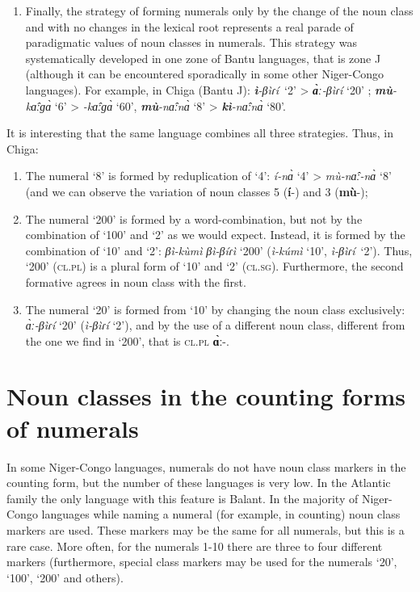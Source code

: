 \begin{enumerate}
\item  Finally, the strategy of forming numerals only by the change of the noun class and with no changes in the lexical root represents a real parade of paradigmatic values of noun classes in numerals. This strategy was systematically developed in one zone of Bantu languages, that is zone J (although it can be encountered sporadically in some other Niger-Congo languages). For example, in Chiga (Bantu J): \textbf{\textit{ì}}\textit{-}\textit{βìɾí}~‘2’ > \textbf{\textit{{\`{ɑ}}ː}}\textit{-}\textit{βìɾí} ‘20’ ;  \textbf{\textit{m{\`{u}}}}\textit{-k{\^{ɑ}}ːɡ{\`{ɑ}}} ‘6’ >  \textbf{\textit{{}}}\textit{-k{\^{ɑ}}ːɡ{\`{ɑ}}} ‘60’, \textbf{\textit{m{\`{u}}}}\textit{-n{\^{ɑ}}ːn{\`{ɑ}}} ‘8’ > \textbf{\textit{kì}}\textit{-n{\^{ɑ}}ːn{\`{ɑ}}} ‘80’. 
\end{enumerate}

It is interesting that the same language combines all three strategies. Thus, in Chiga: 

\begin{enumerate}
\item The numeral ‘8’ is formed by reduplication of ‘4’: \textit{í-n{\`{ɑ}}} ‘4’ > \textit{m{\`{u}}-n{\^{ɑ}}ː-n{\`{ɑ}}} ‘8’ (and we can observe the variation of noun classes 5 (\textbf{í}-) and 3 (\textbf{m{\`{u}}}-);
\item The numeral ‘200’ is formed by a word-combination, but not by the combination of ‘100’ and ‘2’ as we would expect. Instead, it is formed by the combination of ‘10’ and ‘2’: \textit{βì-k{\`{u}}mì} \textit{βì-}\textit{βíɾì} ‘200’ (\textit{ì-kúmì} ‘10’, \textit{ì-β}\textit{ìɾí}~‘2’). Thus, ‘200’ (\textsc{cl}.\textsc{pl}) is a plural form of ‘10’ and ‘2’ (\textsc{cl}.\textsc{sg}). Furthermore, the second formative agrees in noun class with the first. 
\item The numeral ‘20’ is formed from ‘10’ by changing the noun class exclusively: \textit{{\`{ɑ}}ː-β}\textit{ìɾí} ‘20’ (\textit{ì-β}\textit{ìɾí} ‘2’), and by the use of a different noun class, different from the one we find in ‘200’, that is \textsc{cl}.\textsc{pl} \textbf{{\`{ɑ}}ː}-.  
\end{enumerate}

\section{Noun classes in the counting forms of numerals} %

In some Niger-Congo languages, numerals do not have noun class markers in the counting form, but the number of these languages is very low. In the Atlantic family the only language with this feature is Balant. In the majority of Niger-Congo languages while naming a numeral (for example, in counting) noun class markers are used. These markers may be the same for all numerals, but this is a rare case. More often, for the numerals 1-10 there are three to four different markers (furthermore, special class markers may be used for the numerals ‘20’, ‘100’, ‘200’ and others). 

